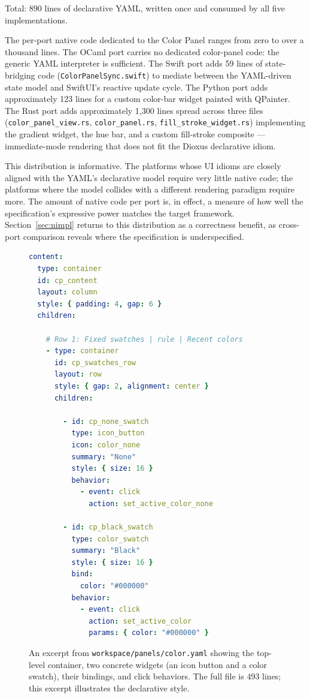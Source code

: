 \documentclass[10pt]{article}
\begin{document}
Total: 890 lines of declarative YAML, written once and consumed by all
five implementations.

The per-port native code dedicated to the Color Panel ranges from zero to
over a thousand lines. The OCaml port carries no dedicated color-panel
code: the generic YAML interpreter is sufficient. The Swift port adds 59
lines of state-bridging code (\texttt{ColorPanelSync.swift}) to mediate
between the YAML-driven state model and SwiftUI's reactive update cycle.
The Python port adds approximately 123 lines for a custom color-bar widget
painted with QPainter. The Rust port adds approximately 1{,}300 lines
spread across three files (\texttt{color\_panel\_view.rs},
\texttt{color\_panel.rs}, \texttt{fill\_stroke\_widget.rs}) implementing
the gradient widget, the hue bar, and a custom fill-stroke composite ---
immediate-mode rendering that does not fit the Dioxus declarative idiom.

This distribution is informative. The platforms whose UI idioms are
closely aligned with the YAML's declarative model require very little
native code; the platforms where the model collides with a different
rendering paradigm require more. The amount of native code per port is, in
effect, a measure of how well the specification's expressive power matches
the target framework. Section~\ref{sec:nimpl} returns to this distribution
as a correctness benefit, as cross-port comparison reveals where the
specification is underspecified.

\begin{figure}[h]
\centering
\begin{lstlisting}[language=yaml]
content:
  type: container
  id: cp_content
  layout: column
  style: { padding: 4, gap: 6 }
  children:

    # Row 1: Fixed swatches | rule | Recent colors
    - type: container
      id: cp_swatches_row
      layout: row
      style: { gap: 2, alignment: center }
      children:

        - id: cp_none_swatch
          type: icon_button
          icon: color_none
          summary: "None"
          style: { size: 16 }
          behavior:
            - event: click
              action: set_active_color_none

        - id: cp_black_swatch
          type: color_swatch
          summary: "Black"
          style: { size: 16 }
          bind:
            color: "#000000"
          behavior:
            - event: click
              action: set_active_color
              params: { color: "#000000" }
\end{lstlisting}
\caption{An excerpt from \texttt{workspace/panels/color.yaml} showing the
top-level container, two concrete widgets (an icon button and a color
swatch), their bindings, and click behaviors. The full file is 493 lines;
this excerpt illustrates the declarative style.}
\label{fig:yaml}
\end{figure}
\end{document}
